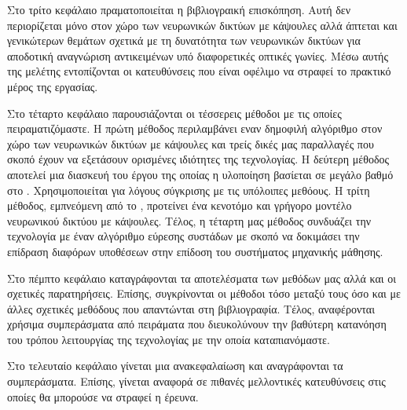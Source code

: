 Στο τρίτο κεφάλαιο πραματοποιείται η βιβλιογραική επισκόπηση. Αυτή δεν περιορίζεται μόνο στον χώρο των νευρωνικών δικτύων με κάψουλες αλλά άπτεται και γενικώτερων θεμάτων σχετικά με τη δυνατότητα των νευρωνικών δικτύων για αποδοτική αναγνώριση αντικειμένων υπό διαφορετικές οπτικές γωνίες. Μέσω αυτής της μελέτης εντοπίζονται οι κατευθύνσεις που είναι οφέλιμο να στραφεί το πρακτικό μέρος της εργασίας.\par

Στο τέταρτο κεφάλαιο παρουσιάζονται οι τέσσερεις μέθοδοι με τις οποίες πειραματιζόμαστε. Η πρώτη μέθοδος περιλαμβάνει εναν δημοφιλή αλγόριθμο στον χώρο των νευρωνικών δικτύων με κάψουλες και τρείς δικές μας παραλλαγές που σκοπό έχουν να εξετάσουν ορισμένες ιδιότητες της τεχνολογίας. Η δεύτερη μέθοδος αποτελεί μια διασκευή του έργου \cite{hinton2018matrix} της οποίας η υλοποίηση βασίεται σε μεγάλο βαθμό στο \cite{gritzman2019avoiding}. Χρησιμοποιείται για λόγους σύγκρισης με τις υπόλοιπες μεθόους. Η τρίτη μέθοδος, εμπνεόμενη από το \cite{mazzia2021efficient}, προτείνει ένα κενοτόμο και γρήγορο μοντέλο νευρωνικού δικτύου με κάψουλες. Τέλος, η τέταρτη μας μέθοδος συνδυάζει την τεχνολογία με έναν αλγόριθμο εύρεσης συστάδων με σκοπό να δοκιμάσει την επίδραση διαφόρων υποθέσεων στην επίδοση του συστήματος μηχανικής μάθησης.\par

Στο πέμπτο κεφάλαιο καταγράφονται τα αποτελέσματα των μεθόδων μας αλλά και οι σχετικές παρατηρήσεις. Επίσης, συγκρίνονται οι μέθοδοι τόσο μεταξύ τους όσο και με άλλες σχετικές μεθόδους που απαντώνται στη βιβλιογραφία. Τέλος, αναφέρονται χρήσιμα συμπεράσματα από πειράματα που διευκολύνουν την βαθύτερη κατανόηση του τρόπου λειτουργίας της τεχνολογίας με την οποία καταπιανόμαστε.\par

Στο τελευταίο κεφάλαιο γίνεται μια ανακεφαλαίωση και αναγράφονται τα συμπεράσματα. Επίσης, γίνεται αναφορά σε πιθανές μελλοντικές κατευθύνσεις στις οποίες θα μπορούσε να στραφεί η έρευνα. 
